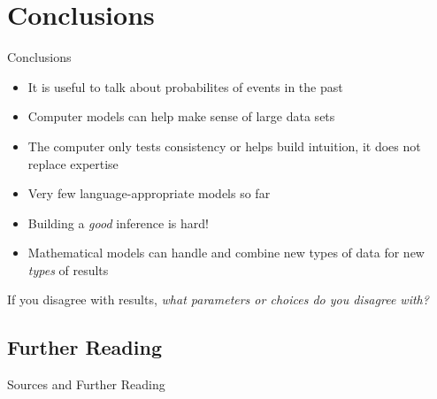 \documentclass[9pt]{beamer}
\begin{document}
\section{Conclusions}
\begin{frame}{Conclusions}
  \begin{itemize}
  \item It is useful to talk about probabilites of events in the past
  \item Computer models can help make sense of large data sets
  \item The computer only tests consistency or helps build intuition, it does not replace expertise
  \item Very few language-appropriate models so far
  \item Building a \emph{good} inference is hard!
  \item Mathematical models can handle and combine new types of data for new \emph{types} of results
  \end{itemize}
  If you disagree with results, \emph{what parameters or choices do you disagree with?}
\end{frame}
\subsection{Further Reading}
\begin{frame}[t,allowframebreaks]{Sources and Further Reading}
  \nocite{mcmahon2005language}
  \printbibliography
\end{frame}
\end{document}
